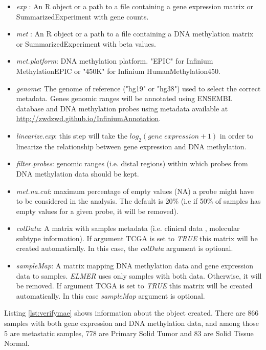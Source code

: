 \begin{itemize}
\item \textit{exp} : An R object or a path to a file containing a gene expression
    matrix or SummarizedExperiment with gene counts.
\item \textit{met} : An R object or a path to a file containing a DNA methylation
    matrix or SummarizedExperiment with beta values.
\item \textit{met.platform}: DNA methylation platform.
    "EPIC" for Infinium MethylationEPIC or "450K" for
    Infinium HumanMethylation450.
 \item \textit{genome}: The genome of reference ("hg19" or "hg38")
    used to select the correct metadata. Genes genomic ranges will be annotated
    using ENSEMBL database and DNA methylation probes
    using metadata available at \url{http://zwdzwd.github.io/InfiniumAnnotation}.
 \item \textit{linearize.exp}: this step will take the $log_2(gene\; expression + 1)$
    in order to linearize the relationship between
    gene expression and DNA methylation.
 \item \textit{filter.probes}: genomic ranges (i.e. distal
    regions) within which  probes from
    DNA methylation data should be kept.
 \item \textit{met.na.cut}: maximum percentage of empty values (NA) a probe might have to be
    considered in the analysis. The default is 20\% (i.e if 50\% of samples has empty values  for a given
    probe, it will be removed).
 \item \textit{colData}: A matrix  with samples metadata (i.e. clinical data ,
    molecular  subtype information). If argument TCGA is set to \textit{TRUE}
    this matrix will be created automatically. In this case, the \textit{colData}
    argument is optional.
 \item \textit{sampleMap}: A matrix mapping DNA methylation data and gene expression
    data to samples. \textit{ELMER} uses only samples with both data.
    Otherwise,  it will be removed. If argument TCGA is set to \textit{TRUE}
    this matrix will be created automatically. In this case \textit{sampleMap}
    argument is optional.
\end{itemize}



Listing \ref{lst:verifymae} shows information about the object created.
There are 866 samples with both gene expression and DNA methylation data,
and among those 5 are metastatic samples, 778 are Primary Solid Tumor and
83 are Solid Tissue Normal.


